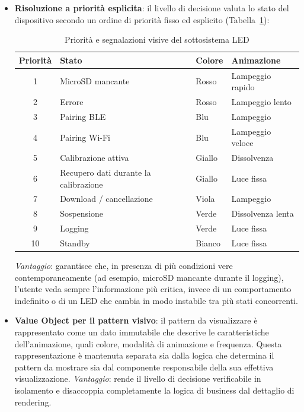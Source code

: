 \begin{itemize}
    \item \textbf{Risoluzione a priorità esplicita}: il livello di decisione valuta lo stato del dispositivo
    secondo un ordine di priorità fisso ed esplicito (Tabella~\ref{tab:led-priorita}):
    \begin{table}[H]
        \centering
        \begin{tabular}{c l l l}
            \hline
            \textbf{Priorità} & \textbf{Stato} & \textbf{Colore} & \textbf{Animazione} \\
            \hline
            1 & MicroSD mancante & Rosso & Lampeggio rapido \\
            2 & Errore & Rosso & Lampeggio lento \\
            3 & Pairing BLE & Blu & Lampeggio \\
            4 & Pairing Wi-Fi & Blu & Lampeggio veloce \\
            5 & Calibrazione attiva & Giallo & Dissolvenza \\
            6 & Recupero dati durante la calibrazione & Giallo & Luce fissa \\
            7 & Download / cancellazione & Viola & Lampeggio \\
            8 & Sospensione & Verde & Dissolvenza lenta \\
            9 & Logging & Verde & Luce fissa \\
            10 & Standby & Bianco & Luce fissa \\
            \hline
        \end{tabular}
        \caption{Priorità e segnalazioni visive del sottosistema LED}
        \label{tab:led-priorita}
    \end{table}
    \textit{Vantaggio}: garantisce che, in presenza di più condizioni vere contemporaneamente (ad esempio, microSD mancante durante il logging), l'utente 
    veda sempre l'informazione più critica, invece di un comportamento indefinito o di un LED che cambia in modo instabile tra più stati concorrenti.
    \item \textbf{Value Object per il pattern visivo}: il pattern da visualizzare è rappresentato come un dato immutabile che descrive le caratteristiche 
    dell'animazione, quali colore, modalità di animazione e frequenza. Questa rappresentazione è mantenuta separata sia dalla logica che determina il pattern 
    da mostrare sia dal componente responsabile della sua effettiva visualizzazione.
    \textit{Vantaggio}: rende il livello di decisione verificabile in isolamento e disaccoppia completamente la logica di business dal dettaglio di rendering.
\end{itemize}

